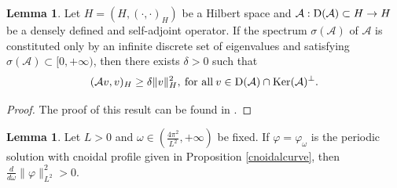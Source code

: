 \documentclass[10pt,reqno,a4paper]{amsart} %
\theoremstyle{definition} %
\numberwithin{equation}{section}
\numberwithin{figure}{section}
\newtheorem{lemma}[theorem]{Lemma}
\begin{document}
\begin{lemma}\label{positivity}
Let $H=(H,(\cdot,\cdot)_H)$ be a Hilbert space and  $\mathcal{A}:{\rm D}(\mathcal{A}) \subset H \to H$ be a densely defined and self-adjoint operator. If the spectrum $\sigma(\mathcal{A})$ of $\mathcal{A}$ is constituted only by an infinite discrete set of eigenvalues and satisfying $\sigma(\mathcal{A})\subset[0,+\infty)$, then there exists $\delta > 0$ such that 
\begin{equation}
	(\mathcal{A} v, v)_{H} \geq \delta \|v\|_{H}^2,\: \text{for all}\: v \in {\rm D}(\mathcal{A}) \cap {\rm Ker}(\mathcal{A})^\perp.
\end{equation}
\end{lemma}
\begin{proof}
    The proof of this result can be found in \cite[Remark 4.1]{NataliBittencourt2024}.
\end{proof}

\begin{lemma}\label{dif-norma}
Let $L>0$ and $\omega \in \left( \frac{4\pi^2}{L^2}, +\infty \right)$ be fixed. {If  $\varphi=\varphi_\omega$ is the periodic solution with cnoidal profile given in Proposition \ref{cnoidalcurve}, then   $\frac{d}{d\omega} \|\varphi\|_{L^2}^2 > 0$.}
\end{lemma}
\end{document}
